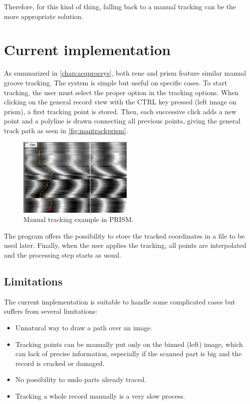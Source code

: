 Therefore, for this kind of thing, falling back to a manual tracking can be the more appropriate solution.

\section{Current implementation}
\label{sec:mancurrentimpl}

As summarized in \autoref{chap:acqprocsys}, both \gls{rene} and \gls{prism} feature similar manual groove tracking. The system is simple but useful on specific cases. To start tracking, the user must select the proper option in the tracking options. When clicking on the general record view with the CTRL key pressed (left image on \gls{prism}), a first tracking point is stored. Then, each successive click adds a new point and a polyline is drawn connecting all previous points, giving the general track path as seen in \autoref{fig:mantrackprism}.

\begin{figure}[!ht]
\centering
\includegraphics[width=0.5\textwidth]{images/manual-tracking-prism}
\caption{Manual tracking example in PRISM.}
\label{fig:mantrackprism}
\end{figure}

The program offers the possibility to store the tracked coordinates in a file to be used later. Finally, when the user applies the tracking, all points are interpolated and the processing step starts as usual.

\subsection{Limitations}

The current implementation is suitable to handle some complicated cases but suffers from several limitations:

\begin{itemize}
\item Unnatural way to draw a path over an image.
\item Tracking points can be manually put only on the binned (left) image, which can lack of precise information, especially if the scanned part is big and the record is cracked or damaged.
\item No possibility to undo parts already traced.
\item Tracking a whole record manually is a very slow process.
\end{itemize}

